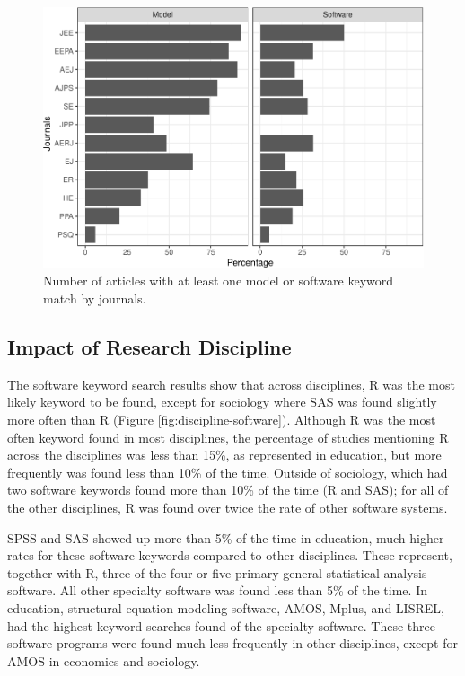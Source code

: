 \documentclass[
  english,
  ,man]{apa7}
\begin{document}
\begin{figure}
\centering
\includegraphics{software_files/figure-latex/count-software-1.pdf}
\caption{\label{fig:count-software}Number of articles with at least one model or software keyword match by journals.}
\end{figure}

\hypertarget{impact-of-research-discipline}{%
\subsection{Impact of Research Discipline}\label{impact-of-research-discipline}}

The software keyword search results show that across disciplines, R was the most likely keyword to be found, except for sociology where SAS was found slightly more often than R (Figure \ref{fig:discipline-software}). Although R was the most often keyword found in most disciplines, the percentage of studies mentioning R across the disciplines was less than 15\%, as represented in education, but more frequently was found less than 10\% of the time. Outside of sociology, which had two software keywords found more than 10\% of the time (R and SAS); for all of the other disciplines, R was found over twice the rate of other software systems.

SPSS and SAS showed up more than 5\% of the time in education, much higher rates for these software keywords compared to other disciplines. These represent, together with R, three of the four or five primary general statistical analysis software. All other specialty software was found less than 5\% of the time. In education, structural equation modeling software, AMOS, Mplus, and LISREL, had the highest keyword searches found of the specialty software. These three software programs were found much less frequently in other disciplines, except for AMOS in economics and sociology.
\end{document}
